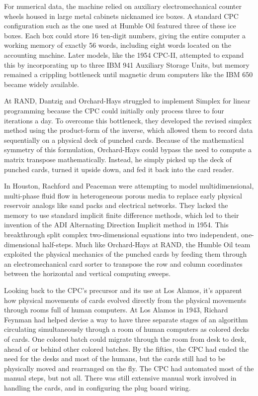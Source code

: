 For numerical data, the machine relied on auxiliary electromechanical counter wheels housed in large metal cabinets nicknamed ice boxes. A standard CPC configuration such as the one used at Humble Oil featured three of these ice boxes. Each box could store 16 ten-digit numbers, giving the entire computer a working memory of exactly 56 words, including eight words located on the accounting machine. Later models, like the 1954 CPC-II, attempted to expand this by incorporating up to three IBM 941 Auxiliary Storage Units, but memory remained a crippling bottleneck until magnetic drum computers like the IBM 650 became widely available.

At RAND, Dantzig and Orchard-Hays struggled to implement Simplex for linear programming because the CPC could initially only process three to four iterations a day. To overcome this bottleneck, they developed the revised simplex method using the product-form of the inverse, which allowed them to record data sequentially on a physical deck of punched cards. Because of the mathematical symmetry of this formulation, Orchard-Hays could bypass the need to compute a matrix transpose mathematically. Instead, he simply picked up the deck of punched cards, turned it upside down, and fed it back into the card reader.

In Houston, Rachford and Peaceman were attempting to model multidimensional, multi-phase fluid flow in heterogeneous porous media to replace early physical reservoir analogs like sand packs and electrical networks. They lacked the memory to use standard implicit finite difference methods, which led to their invention of the ADI Alternating Direction Implicit method in 1954. This breakthrough split complex two-dimensional equations into two independent, one-dimensional half-steps. Much like Orchard-Hays at RAND, the Humble Oil team exploited the physical mechanics of the punched cards by feeding them through an electromechanical card sorter to transpose the row and column coordinates between the horizontal and vertical computing sweeps.

Looking back to the CPC’s precursor and its use at Los Alamos, it’s apparent how physical movements of cards evolved directly from the physical movements through rooms full of human computers. At Los Alamos in 1943, Richard Feynman had helped devise a way to have three separate stages of an algorithm circulating simultaneously through a room of human computers as colored decks of cards. One colored batch could migrate through the room from desk to desk, ahead of or behind other colored batches. By the fifties, the CPC had ended the need for the desks and most of the humans, but the cards still had to be physically moved and rearranged on the fly. The CPC had automated most of the manual steps, but not all. There was still extensive manual work involved in handling the cards, and in configuring the plug board wiring.

